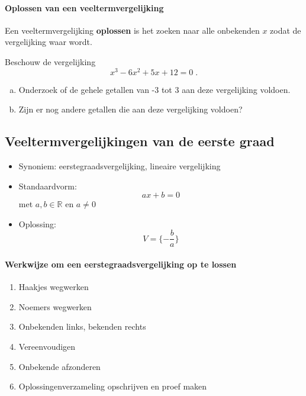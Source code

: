 \documentclass[12pt]{article}
\begin{document}
\paragraph{Oplossen van een veeltermvergelijking}
\begin{mdframed}
  Een veeltermvergelijking {\bf oplossen} is het zoeken naar alle onbekenden $x$ zodat de vergelijking waar wordt.
\end{mdframed}



\begin{oefening}
  Beschouw de vergelijking
  $$x^3-6x^2+5x+12=0\;.$$
  \begin{enumerate}[(a)]
  \item Onderzoek of de gehele getallen van -3 tot 3 aan deze vergelijking voldoen.
  \item Zijn er nog andere getallen die aan deze vergelijking voldoen?
  \end{enumerate}
\end{oefening}



\pagebreak
\subsection{Veeltermvergelijkingen van de eerste graad}

\begin{itemize}
\item Synoniem: eerstegraadsvergelijking, lineaire vergelijking
\item Standaardvorm:
  $$ax + b = 0$$
  met $a, b \in \mathbb{R}$ en $a\neq 0$
\item Oplossing:
  $$V=\{-\dfrac{b}{a}\}$$
\end{itemize}

\paragraph{Werkwijze om een eerstegraadsvergelijking op te lossen}
\begin{enumerate}
\item Haakjes wegwerken
\item Noemers wegwerken
\item Onbekenden links, bekenden rechts
\item Vereenvoudigen
\item Onbekende afzonderen
\item Oplossingenverzameling opschrijven en proef maken
\end{enumerate}
\end{document}
